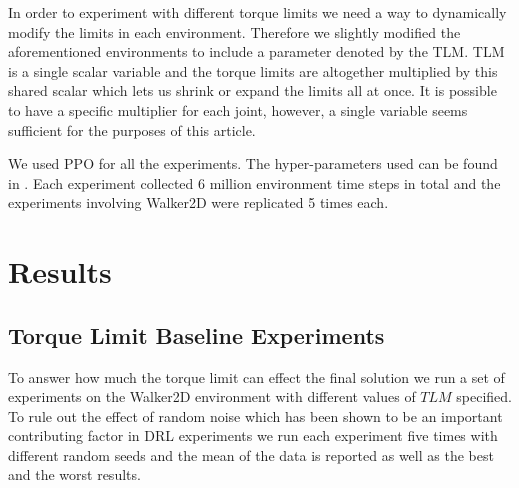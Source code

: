 In order to experiment with different torque limits we need a way to dynamically modify the limits in each environment. Therefore we slightly modified the aforementioned environments to include a parameter denoted by the \ac{TLM}. \ac{TLM} is a single scalar variable and the torque limits are altogether multiplied by this shared scalar which lets us shrink or expand the limits all at once. It is possible to have a specific multiplier for each joint, however, a single variable seems sufficient for the purposes of this article.

We used PPO \cite{ppo} for all the experiments. The hyper-parameters used can be found in . Each experiment collected 6 million environment time steps in total and the experiments involving Walker2D were replicated 5 times each.





\section{Results}

\subsection{Torque Limit Baseline Experiments}

To answer how much the torque limit can effect the final solution we run a set of experiments on the Walker2D environment with different values of $TLM$ specified. To rule out the effect of random noise which has been shown to be an important contributing factor in \ac{DRL} experiments \cite{rl_that_matters} we run each experiment five times with different random seeds and the mean of the data is reported as well as the best and the worst results.

